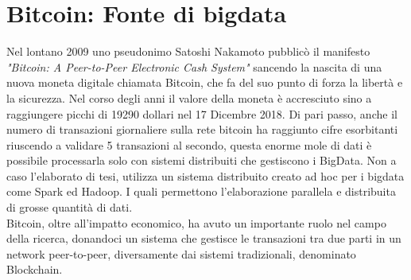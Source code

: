 \chapter{Bitcoin: Fonte di bigdata}
\label{chap:bitcoin fonte di bigdata}

Nel lontano 2009 uno pseudonimo Satoshi Nakamoto pubblicò il manifesto \textit{"Bitcoin: A Peer-to-Peer Electronic Cash System"}\cite{bitcoin:white-paper} sancendo la nascita di una nuova moneta digitale chiamata Bitcoin, che fa  del suo punto di forza la libertà e la sicurezza. Nel corso degli anni il valore della moneta è accresciuto sino a raggiungere picchi di 19290 dollari nel 17 Dicembre 2018\cite{blockchain.com:valueOf}. Di pari passo, anche il numero di transazioni giornaliere sulla rete bitcoin ha raggiunto cifre esorbitanti riuscendo a validare 5 transazioni al secondo\cite{blockchain.com:transactions}, questa enorme mole di dati è possibile processarla solo con sistemi distribuiti che gestiscono i BigData. Non a caso l'elaborato di tesi, utilizza un sistema distribuito creato ad hoc per i bigdata come Spark ed Hadoop. I quali permettono l'elaborazione parallela e distribuita di grosse quantità di dati.
\\Bitcoin, oltre all'impatto economico, ha avuto un importante ruolo nel campo della ricerca, donandoci un sistema che gestisce le transazioni tra due parti in un network peer-to-peer, diversamente dai sistemi tradizionali, denominato Blockchain.




